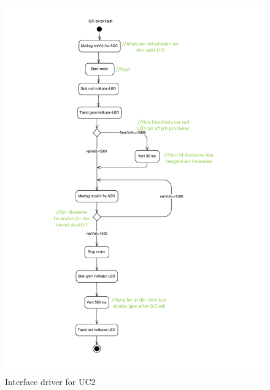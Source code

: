 \begin{figure}[H]
	\centering
	\includegraphics[width=\textwidth]{Afsnit/DesignOgImplementering/images/Aktivitetsdiagram_ISR_detektor}
	\caption{Interface driver for UC2}
	\label{fig:aktivitetsdiagramDetektor}
\end{figure}

